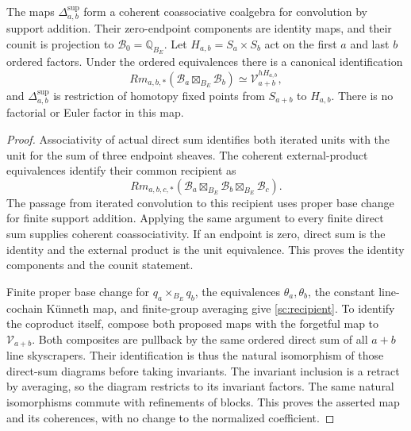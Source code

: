 \begin{theorem}\label{sc:coalgebra}
The maps $\Delta^{\mathrm{sup}}_{a,b}$ form a coherent coassociative
coalgebra for convolution by support addition. Their zero-endpoint
components are identity maps, and their counit is projection to
$\mathcal B_0=\mathbb Q_{B_E}$.
Let $H_{a,b}=S_a\times S_b$ act on the first $a$ and last $b$
ordered factors. Under the ordered equivalences there is a canonical
identification
\begin{equation}\label{sc:recipient}
 Rm_{a,b,*}(\mathcal B_a\boxtimes_{B_E}\mathcal B_b)
       \simeq \mathcal V_{a+b}^{hH_{a,b}},
\end{equation}
and $\Delta^{\mathrm{sup}}_{a,b}$ is restriction of homotopy
fixed points from $S_{a+b}$ to $H_{a,b}$. There is no factorial
or Euler factor in this map.
\end{theorem}
\begin{proof}
Associativity of actual direct sum identifies both iterated units
with the unit for the sum of three endpoint sheaves. The coherent
external-product equivalences identify their common recipient as
\[
 Rm_{a,b,c,*}(\mathcal B_a\boxtimes_{B_E}\mathcal B_b
                                      \boxtimes_{B_E}\mathcal B_c).
\]
The passage from iterated convolution to this recipient uses proper
base change for finite support addition. Applying the same argument
to every finite direct sum supplies coherent coassociativity.
If an endpoint is zero, direct sum is the identity and the external
product is the unit equivalence. This proves the identity components
and the counit statement.

Finite proper base change for $q_a\times_{B_E}q_b$, the
equivalences $\theta_a,\theta_b$, the constant line-cochain
K\"unneth map, and finite-group averaging give
\eqref{sc:recipient}. To identify the coproduct itself, compose
both proposed maps with the forgetful map to $\mathcal V_{a+b}$.
Both composites are pullback by the same ordered direct sum of
all $a+b$ line skyscrapers. Their identification is thus the natural
isomorphism of those direct-sum diagrams before taking invariants.
The invariant inclusion is a retract by averaging, so the diagram
restricts to its invariant factors. The same natural isomorphisms
commute with refinements of blocks. This proves the asserted map
and its coherences, with no change to the normalized coefficient.
\end{proof}

